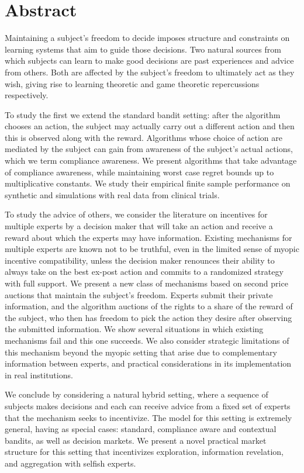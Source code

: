 \chapter*{Abstract}
\vspace{-1em}


Maintaining a subject's freedom to decide imposes structure and constraints on learning systems that aim to guide those decisions. Two natural sources from which subjects can learn to make good decisions are past experiences and advice from others. Both are affected by the subject's freedom to ultimately act as they wish, giving rise to learning theoretic and game theoretic repercussions respectively.

To study the first we extend the standard bandit setting: after the algorithm chooses an action, the subject may actually carry out a different action and then this is observed along with the reward. Algorithms whose choice of action are mediated by the subject can gain from awareness of the subject's actual actions, which we term compliance awareness. We present algorithms that take advantage of compliance awareness, while maintaining worst case regret bounds up to multiplicative constants.  We study their empirical finite sample performance on synthetic and simulations with real data from clinical trials. 

To study the advice of others, we consider the literature on incentives for multiple experts by a decision maker that will take an action and receive a reward about which the experts may have information. Existing mechanisms for multiple experts are known not to be truthful, even in the limited sense of myopic incentive compatibility, unless the decision maker renounces their ability to always take on the best ex-post action and commits to a randomized strategy with full support. We present a new class of mechanisms based on second price auctions that maintain the subject's freedom. Experts submit their private information, and the algorithm auctions of the rights to a share of the reward of the subject, who then has freedom to pick the action they desire after observing the submitted information. We show several situations in which existing mechanisms fail and this one succeeds. We also consider strategic limitations of this mechanism beyond the myopic setting that arise due to complementary information between experts, and practical considerations in its implementation in real institutions.


We conclude by considering a natural hybrid setting, where a sequence of subjects makes decisions and each can receive advice from a fixed set of experts that the mechanism seeks to incentivize. 
The model for this setting is extremely general, having as special cases: standard, compliance aware and contextual bandits, as well as decision markets.
We present a novel practical market structure for this setting that incentivizes exploration, information revelation, and aggregation with selfish experts.


